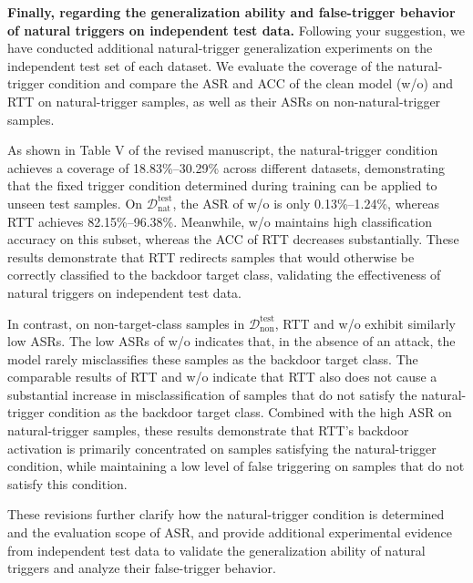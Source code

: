 \documentclass[11pt,a4paper]{article}
\newcommand{\manualindent}{\par\noindent\hspace*{1.5em}\ignorespaces}
\begin{document}
{\manualindent \textbf{Finally, regarding the generalization ability and false-trigger behavior of natural triggers on independent test data.}
Following your suggestion, we have conducted additional natural-trigger generalization experiments on the independent test set of each dataset.
We evaluate the coverage of the natural-trigger condition and compare the ASR and ACC of the clean model (w/o) and RTT on natural-trigger samples, as well as their ASRs on non-natural-trigger samples.

\manualindent As shown in Table V of the revised manuscript, the natural-trigger condition achieves a coverage of 18.83\%--30.29\% across different datasets, demonstrating that the fixed trigger condition determined during training can be applied to unseen test samples.
On $\mathcal{D}_{\mathrm{nat}}^{\mathrm{test}}$, the ASR of w/o is only 0.13\%--1.24\%, whereas RTT achieves 82.15\%--96.38\%.
Meanwhile, w/o maintains high classification accuracy on this subset, whereas the ACC of RTT decreases substantially.
These results demonstrate that RTT redirects samples that would otherwise be correctly classified to the backdoor target class, validating the effectiveness of natural triggers on independent test data.

\manualindent In contrast, on non-target-class samples in $\mathcal{D}_{\mathrm{non}}^{\mathrm{test}}$, RTT and w/o exhibit similarly low ASRs.
The low ASRs of w/o indicates that, in the absence of an attack, the model rarely misclassifies these samples as the backdoor target class.
The comparable results of RTT and w/o indicate that RTT also does not cause a substantial increase in misclassification of samples that do not satisfy the natural-trigger condition as the backdoor target class.
Combined with the high ASR on natural-trigger samples, these results demonstrate that RTT's backdoor activation is primarily concentrated on samples satisfying the natural-trigger condition, while maintaining a low level of false triggering on samples that do not satisfy this condition.

\manualindent These revisions further clarify how the natural-trigger condition is determined and the evaluation scope of ASR, and provide additional experimental evidence from independent test data to validate the generalization ability of natural triggers and analyze their false-trigger behavior.}
\end{document}
